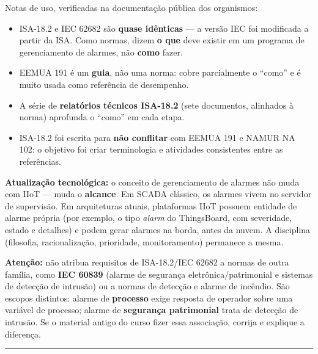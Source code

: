 Notas de uso, verificadas na documentação pública dos organismos:

\begin{itemize}
\tightlist
\item
  ISA-18.2 e IEC 62682 são \textbf{quase idênticas} --- a versão IEC foi modificada a partir da ISA. Como normas, dizem \textbf{o que} deve existir em um programa de gerenciamento de alarmes, não \textbf{como} fazer.
\item
  EEMUA 191 é um \textbf{guia}, não uma norma: cobre parcialmente o ``como'' e é muito usada como referência de desempenho.
\item
  A série de \textbf{relatórios técnicos ISA-18.2} (sete documentos, alinhados à norma) aprofunda o ``como'' em cada etapa.
\item
  ISA-18.2 foi escrita para \textbf{não conflitar} com EEMUA 191 e NAMUR NA 102: o objetivo foi criar terminologia e atividades consistentes entre as referências.
\end{itemize}

\begin{caixanota}

\textbf{Atualização tecnológica:} o conceito de gerenciamento de alarmes não muda com IIoT --- muda o \textbf{alcance}. Em SCADA clássico, os alarmes vivem no servidor de supervisão. Em arquiteturas atuais, plataformas IIoT possuem entidade de alarme própria (por exemplo, o tipo \emph{alarm} do ThingsBoard, com severidade, estado e detalhes) e podem gerar alarmes na borda, antes da nuvem. A disciplina (filosofia, racionalização, prioridade, monitoramento) permanece a mesma.

\end{caixanota}

\begin{caixaatencao}

\textbf{Atenção:} não atribua requisitos de ISA-18.2/IEC 62682 a normas de outra família, como \textbf{IEC 60839} (alarme de segurança eletrônica/patrimonial e sistemas de detecção de intrusão) ou a normas de detecção e alarme de incêndio. São escopos distintos: alarme de \textbf{processo} exige resposta de operador sobre uma variável de processo; alarme de \textbf{segurança patrimonial} trata de detecção de intrusão. Se o material antigo do curso fizer essa associação, corrija e explique a diferença.

\end{caixaatencao}

\begin{center}\rule{0.5\linewidth}{0.5pt}\end{center}

